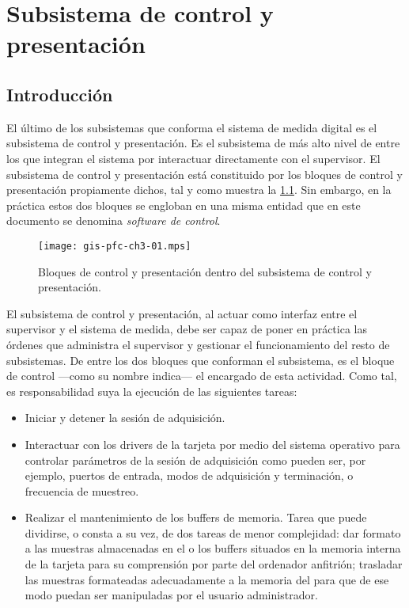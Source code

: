 \chapter{Subsistema de control y presentación}

\section{Introducción}

El último de los subsistemas que conforma el sistema de medida digital es el subsistema de control y presentación. Es el subsistema de más alto nivel de entre los que integran el sistema por interactuar directamente con el supervisor. El subsistema de control y presentación está constituido por los bloques de control y presentación propiamente dichos, tal y como muestra la \cref{fig:subconpre}. Sin embargo, en la práctica estos dos bloques se engloban en una misma entidad que en este documento se denomina \emph{software de control}.\par

\begin{figure}
	\begin{center}
		\texttt{[image: gis-pfc-ch3-01.mps]}
	\end{center}
	\caption[Subsistema de control y presentación]{Bloques de control y presentación dentro del subsistema de control y presentación.}
	\label{fig:subconpre}
\end{figure}

El subsistema de control y presentación, al actuar como interfaz entre el supervisor y el sistema de medida, debe ser capaz de poner en práctica las órdenes que administra el supervisor y gestionar el funcionamiento del resto de subsistemas. De entre los dos bloques que conforman el subsistema, es el bloque de control ---como su nombre indica--- el encargado de esta actividad. Como tal, es responsabilidad suya la ejecución de las siguientes tareas:

\begin{itemize}
	\item Iniciar y detener la sesión de adquisición.
	\item Interactuar con los drivers de la tarjeta por medio del sistema operativo para controlar parámetros de la sesión de adquisición como pueden ser, por ejemplo, puertos de entrada, modos de adquisición y terminación, o frecuencia de muestreo.
	\item Realizar el mantenimiento de los buffers de memoria. Tarea que puede dividirse, o consta a su vez, de dos tareas de menor complejidad: dar formato a las muestras almacenadas en el o los buffers situados en la memoria interna de la tarjeta para su comprensión por parte del ordenador anfitrión; trasladar las muestras formateadas adecuadamente a la memoria del \pc{} para que de ese modo puedan ser manipuladas por el usuario administrador.
\end{itemize}

